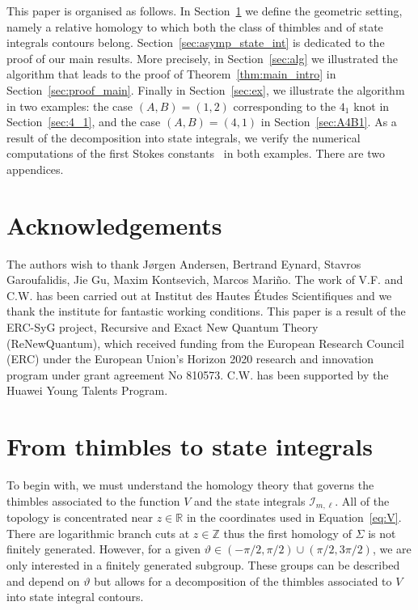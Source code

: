 \documentclass[12pt,reqno]{amsart}
\theoremstyle{definition}
\def\BZ{\mathbb Z}
\def\BR{\mathbb R}
\def\calI{\mathcal I}
\renewcommand{\=}{\;=\;}
\begin{document}
This paper is organised as follows. In Section~\ref{sec:geometry} we define the geometric setting, namely a relative homology to which both the class of thimbles and of state integrals contours belong. Section~\ref{sec:asymp_state_int} is dedicated to the proof of our main results. More precisely, in Section~\ref{sec:alg} we illustrated the algorithm that leads to the proof of Theorem~\ref{thm:main_intro} in Section~\ref{sec:proof_main}. Finally in Section~\ref{sec:ex}, we illustrate the algorithm in two examples: the case $(A,B)=(1,2)$ corresponding to the $4_1$ knot in Section~\ref{sec:4_1}, and the case $(A,B)=(4,1)$ in Section~\ref{sec:A4B1}. As a result of the decomposition into state integrals, we verify the numerical computations of the first Stokes constants~\cite{GGM:I,Wh:thesis} in both examples. There are two appendices.   

\section*{Acknowledgements}

The authors wish to thank Jørgen Andersen, Bertrand Eynard, Stavros Garoufalidis, Jie Gu, Maxim Kontsevich, Marcos Mariño. The work of V.F. and C.W. has been carried out at Institut des Hautes Études Scientifiques and we thank the institute for fantastic working conditions.
This paper is a result of the ERC-SyG project, Recursive and Exact New Quantum Theory (ReNewQuantum), which received funding from the European Research Council (ERC) under the European Union's Horizon 2020 research and innovation program under grant agreement No 810573. C.W. has been supported by the Huawei Young Talents Program.

\section{From thimbles to state integrals}\label{sec:geometry}

To begin with, we must understand the homology theory that governs the thimbles associated to the function $V$ and the state integrals $\calI_{m,\ell}$. All of the topology is concentrated near $z\in\BR$ in the coordinates used in Equation~\eqref{eq:V}. There are logarithmic branch cuts at $z\in\BZ$ thus the first homology of $\Sigma$ is not finitely generated. However, for a given $\vartheta\in (-\pi/2,\pi/2)\cup(\pi/2,3\pi/2)$, we are only interested in a finitely generated subgroup. These groups can be described and depend on $\vartheta$ but allows for a decomposition of the thimbles associated to $V$ into state integral contours.
\end{document}
